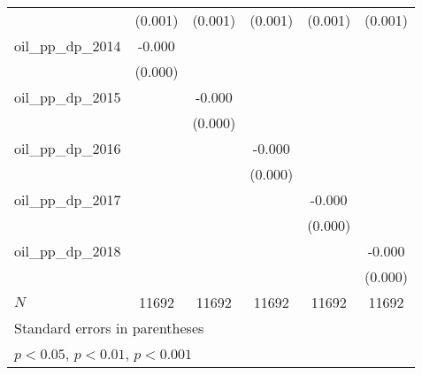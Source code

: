 {\begin{tabular}{l*{5}{c}}
            &     (0.001)         &     (0.001)         &     (0.001)         &     (0.001)         &     (0.001)         \\
[1em]
oil\_pp\_dp\_2014&      -0.000         &                     &                     &                     &                     \\
            &     (0.000)         &                     &                     &                     &                     \\
[1em]
oil\_pp\_dp\_2015&                     &      -0.000         &                     &                     &                     \\
            &                     &     (0.000)         &                     &                     &                     \\
[1em]
oil\_pp\_dp\_2016&                     &                     &      -0.000         &                     &                     \\
            &                     &                     &     (0.000)         &                     &                     \\
[1em]
oil\_pp\_dp\_2017&                     &                     &                     &      -0.000         &                     \\
            &                     &                     &                     &     (0.000)         &                     \\
[1em]
oil\_pp\_dp\_2018&                     &                     &                     &                     &      -0.000         \\
            &                     &                     &                     &                     &     (0.000)         \\
\hline
\(N\)       &       11692         &       11692         &       11692         &       11692         &       11692         \\
\hline\hline
\multicolumn{6}{l}{\footnotesize Standard errors in parentheses}\\
\multicolumn{6}{l}{\footnotesize \sym{*} \(p<0.05\), \sym{**} \(p<0.01\), \sym{***} \(p<0.001\)}\\
\end{tabular}
}
